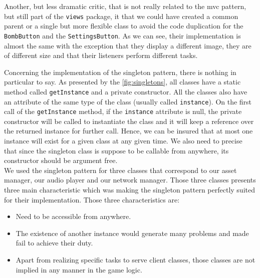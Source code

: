 Another, but less dramatic critic, that is not really related to the \gls{mvc} pattern, but still part of the \texttt{views} package, it that we could have created a common parent or a single but more flexible class to avoid the code duplication for the \texttt{BombButton} and the \texttt{SettingsButton}. As we can see, their implementation is almost the same with the exception that they display a different image, they are of different size and that their listeners perform different tasks.


Concerning the implementation of the singleton pattern, there is nothing in particular to say. As presented by the \autoref{fig:singletons}, all classes have a static method called \texttt{getInstance} and a private constructor. All the classes also have an attribute of the same type of the class (usually called \texttt{instance}). On the first call of the \texttt{getInstance} method, if the \texttt{instance} attribute is null, the private constructor will be called to instantiate the class and it will keep a reference over the returned instance for further call. Hence, we can be insured that at most one instance will exist for a given class at any given time. We also need to precise that since the singleton class is suppose to be callable from anywhere, its constructor should be argument free. \\

We used the singleton pattern for three classes that correspond to our asset manager, our audio player and our network manager. Those three classes presents three main characteristic which was making the singleton pattern perfectly suited for their implementation. Those three characteristics are:
\begin{itemize}
  \item Need to be accessible from anywhere.
  \item The existence of another instance would generate many problems and made fail to achieve their duty.
  \item Apart from realizing specific tasks to serve client classes, those classes are not implied in any manner in the game logic.
\end{itemize}

